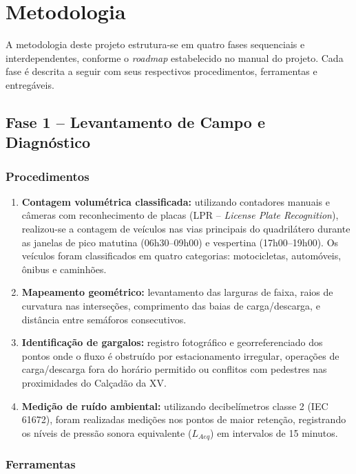 \documentclass[12pt,a4paper,oneside]{abntex2}
\begin{document}
\chapter{Metodologia}

A metodologia deste projeto estrutura-se em quatro fases sequenciais e interdependentes, conforme o \textit{roadmap} estabelecido no manual do projeto. Cada fase é descrita a seguir com seus respectivos procedimentos, ferramentas e entregáveis.

\section{Fase 1 -- Levantamento de Campo e Diagnóstico}

\subsection{Procedimentos}

\begin{enumerate}[label=\textbf{P\arabic*:},leftmargin=2cm]
  \item \textbf{Contagem volumétrica classificada:} utilizando contadores manuais e câmeras com reconhecimento de placas (LPR -- \textit{License Plate Recognition}), realizou-se a contagem de veículos nas vias principais do quadrilátero durante as janelas de pico matutina (06h30--09h00) e vespertina (17h00--19h00). Os veículos foram classificados em quatro categorias: motocicletas, automóveis, ônibus e caminhões.
  \item \textbf{Mapeamento geométrico:} levantamento das larguras de faixa, raios de curvatura nas interseções, comprimento das baias de carga/descarga, e distância entre semáforos consecutivos.
  \item \textbf{Identificação de gargalos:} registro fotográfico e georreferenciado dos pontos onde o fluxo é obstruído por estacionamento irregular, operações de carga/descarga fora do horário permitido ou conflitos com pedestres nas proximidades do Calçadão da XV.
  \item \textbf{Medição de ruído ambiental:} utilizando decibelímetros classe 2 (IEC 61672), foram realizadas medições nos pontos de maior retenção, registrando os níveis de pressão sonora equivalente ($L_{Aeq}$) em intervalos de 15 minutos.
\end{enumerate}

\subsection{Ferramentas}
\end{document}
